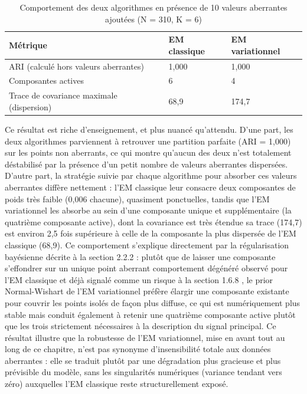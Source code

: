 \begin{table}[H]
\centering
\small
\setlength{\tabcolsep}{0.14cm}
\begin{tabular}{|p{4.84cm}|p{4.84cm}|p{4.84cm}|}
\hline
\textbf{Métrique} & \textbf{EM classique} & \textbf{EM variationnel} \\
\hline
ARI (calculé hors valeurs aberrantes) & 1,000 & 1,000 \\
\hline
Composantes actives & 6 & 4 \\
\hline
Trace de covariance maximale (dispersion) & 68,9 & 174,7 \\
\hline
\end{tabular}
\caption{Comportement des deux algorithmes en présence de 10 valeurs aberrantes ajoutées (N = 310, K = 6)}
\label{tab:2_14}
\end{table}
Ce résultat est riche d'enseignement, et plus nuancé qu'attendu. D'une part, les deux algorithmes parviennent à retrouver une partition parfaite (ARI = 1,000) sur les points non aberrants, ce qui montre qu'aucun des deux n'est totalement déstabilisé par la présence d'un petit nombre de valeurs aberrantes dispersées. D'autre part, la stratégie suivie par chaque algorithme pour absorber ces valeurs aberrantes diffère nettement : l'EM classique leur consacre deux composantes de poids très faible (0,006 chacune), quasiment ponctuelles, tandis que l'EM variationnel les absorbe au sein d'une composante unique et supplémentaire (la quatrième composante active), dont la covariance est très étendue  sa trace (174,7) est environ 2,5 fois supérieure à celle de la composante la plus dispersée de l'EM classique (68,9). Ce comportement s'explique directement par la régularisation bayésienne décrite à la section 2.2.2 : plutôt que de laisser une composante s'effondrer sur un unique point aberrant  comportement dégénéré observé pour l'EM classique et déjà signalé comme un risque à la section 1.6.8 , le prior Normal-Wishart de l'EM variationnel préfère élargir une composante existante pour couvrir les points isolés de façon plus diffuse, ce qui est numériquement plus stable mais conduit également à retenir une quatrième composante active plutôt que les trois strictement nécessaires à la description du signal principal. Ce résultat illustre que la robustesse de l'EM variationnel, mise en avant tout au long de ce chapitre, n'est pas synonyme d'insensibilité totale aux données aberrantes : elle se traduit plutôt par une dégradation plus gracieuse et plus prévisible du modèle, sans les singularités numériques (variance tendant vers zéro) auxquelles l'EM classique reste structurellement exposé.

